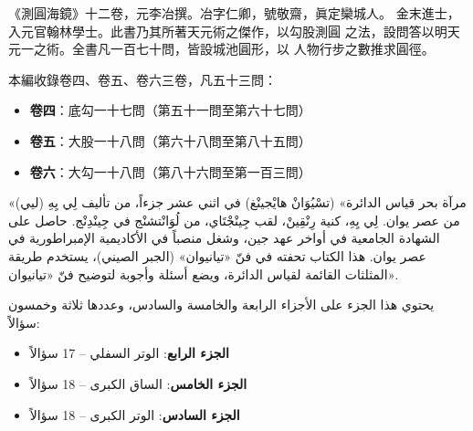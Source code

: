 \documentclass[11pt,a4paper]{article}
\begin{document}
\noindent
\begin{minipage}[t]{0.48\textwidth}
《測圓海鏡》十二卷，元李冶撰。冶字仁卿，號敬齋，眞定欒城人。
金末進士，入元官翰林學士。此書乃其所著天元術之傑作，以勾股測圓
之法，設問答以明天元一之術。全書凡一百七十問，皆設城池圓形，以
人物行步之數推求圓徑。

本編收錄卷四、卷五、卷六三卷，凡五十三問：
\begin{itemize}[leftmargin=1.5em]
  \item \textbf{卷四}：底勾一十七問（第五十一問至第六十七問）
  \item \textbf{卷五}：大股一十八問（第六十八問至第八十五問）
  \item \textbf{卷六}：大勾一十八問（第八十六問至第一百三問）
\end{itemize}
\end{minipage}
\hfill
\begin{minipage}[t]{0.48\textwidth}
\arabicfont\beginR
«مرآة بحر قياس الدائرة» (تسْيُوَانْ هايْجينْغ) في اثني عشر جزءاً،
من تأليف لِي يِهِ (ليي) من عصر يوان. لِي يِهِ، كنية رِنْقِينْ،
لقب جِينْجْتَاي، من لُوَانْتشنْج في جِينْدِنْج. حاصل على الشهادة
الجامعية في أواخر عهد جين، وشغل منصباً في الأكاديمية الإمبراطورية
في عصر يوان. هذا الكتاب تحفته في فنّ «تيانيوان» (الجبر الصيني)،
يستخدم طريقة المثلثات القائمة لقياس الدائرة، ويضع أسئلة وأجوبة
لتوضيح فنّ «تيانيوان».

يحتوي هذا الجزء على الأجزاء الرابعة والخامسة والسادس، وعددها ثلاثة
وخمسون سؤالاً:
\begin{itemize}[leftmargin=1.5em]
  \item \textbf{الجزء الرابع}: الوتر السفلي -- 17 سؤالاً
  \item \textbf{الجزء الخامس}: الساق الكبرى -- 18 سؤالاً
  \item \textbf{الجزء السادس}: الوتر الكبرى -- 18 سؤالاً
\end{itemize}
\endR
\end{minipage}

\vspace{0.5cm}
\end{document}
